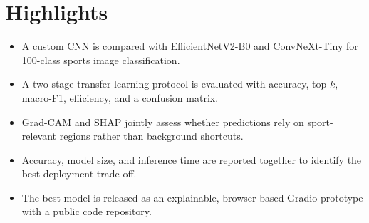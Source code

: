 \documentclass[review]{elsarticle}
\begin{document}
\section*{Highlights}
\begin{itemize}
\item A custom CNN is compared with EfficientNetV2-B0 and ConvNeXt-Tiny for 100-class sports image classification.
\item A two-stage transfer-learning protocol is evaluated with accuracy, top-$k$, macro-F1, efficiency, and a confusion matrix.
\item Grad-CAM and SHAP jointly assess whether predictions rely on sport-relevant regions rather than background shortcuts.
\item Accuracy, model size, and inference time are reported together to identify the best deployment trade-off.
\item The best model is released as an explainable, browser-based Gradio prototype with a public code repository.
\end{itemize}




\end{document}
